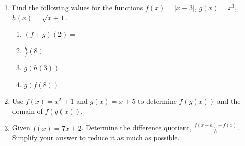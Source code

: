 



\begin{enumerate}

\item Find the following values for the functions $f(x)=|x-3|$, $g(x)=x^3$, $h(x)=\sqrt{x+1}$.
\begin{enumerate}
\item $\displaystyle (f+g)(2)=$
  \vfill
\item $\displaystyle \frac{h}{f}(8)=$
  \vfill
\item $\displaystyle g(h(3))=$
  \vfill
\item $\displaystyle g(f(8))=$
  \vfill
\end{enumerate}

\clearpage

\item  Use $f(x)=x^2+1$ and $g(x)=x+5$ to determine $f(g(x))$ and the domain of $f(g(x))$.
\vfill



\item Given $f(x)=7x+2$.  Determine the difference quotient,
  $\displaystyle \frac{f(x+h)-f(x)}{h}$. Simplify your answer to
  reduce it as much as possible.

\vfill






\end{enumerate}


